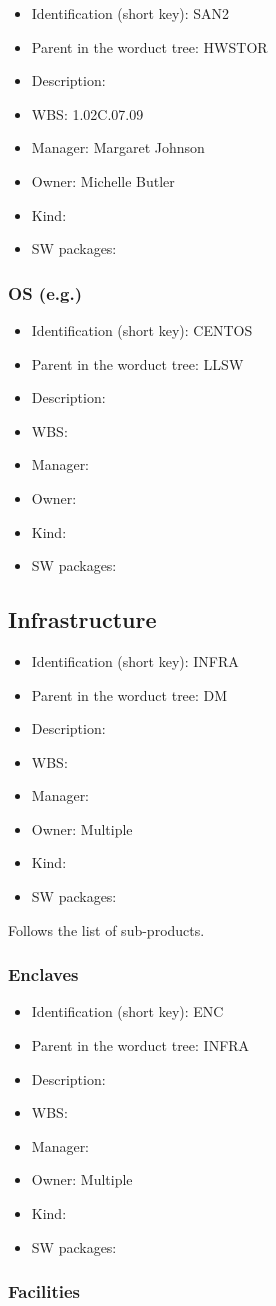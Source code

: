 \begin{itemize}\item Identification (short key): SAN2
\item Parent in the worduct tree: HWSTOR
\item Description: 
\item WBS: 1.02C.07.09
\item Manager: Margaret Johnson
\item Owner: Michelle Butler
\item Kind:
\item SW packages: 
\end{itemize}\subsubsection{OS (e.g.)}
\begin{itemize}\item Identification (short key): CENTOS
\item Parent in the worduct tree: LLSW
\item Description: 
\item WBS: 
\item Manager: 
\item Owner: 
\item Kind:
\item SW packages: 
\end{itemize}\subsection{Infrastructure}
\begin{itemize}\item Identification (short key): INFRA
\item Parent in the worduct tree: DM
\item Description: 
\item WBS: 
\item Manager: 
\item Owner: Multiple
\item Kind:
\item SW packages: 
\end{itemize}Follows the list of sub-products.\subsubsection{Enclaves}
\begin{itemize}\item Identification (short key): ENC
\item Parent in the worduct tree: INFRA
\item Description: 
\item WBS: 
\item Manager: 
\item Owner: Multiple
\item Kind:
\item SW packages: 
\end{itemize}\subsubsection{Facilities}
